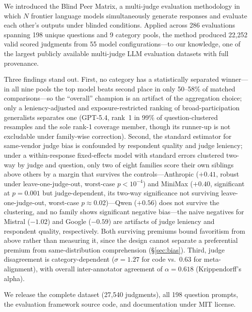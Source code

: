 \documentclass{article}
\begin{document}
We introduced the Blind Peer Matrix, a multi-judge evaluation methodology in which $N$ frontier language models simultaneously generate responses and evaluate each other's outputs under blinded conditions. Applied across 286 evaluations spanning 198 unique questions and 9 category pools, the method produced 22,252 valid scored judgments from 55 model configurations---to our knowledge, one of the largest publicly available multi-judge LLM evaluation datasets with full provenance.

Three findings stand out. First, no category has a statistically separated winner---in all nine pools the top model beats second place in only 50--58\% of matched comparisons---so the ``overall'' champion is an artifact of the aggregation choice; only a leniency-adjusted and exposure-restricted ranking of broad-participation generalists separates one (GPT-5.4, rank~1 in 99\% of question-clustered resamples and the sole rank-1 coverage member, though its runner-up is not excludable under family-wise correction). Second, the standard estimator for same-vendor judge bias is confounded by respondent quality and judge leniency; under a within-response fixed-effects model with standard errors clustered two-way by judge and question, only two of eight families score their own siblings above others by a margin that survives the controls---Anthropic ($+0.41$, robust under leave-one-judge-out, worst-case $p < 10^{-4}$) and MiniMax ($+0.40$, significant at $p = 0.001$ but judge-dependent, its two-way significance not surviving leave-one-judge-out, worst-case $p \approx 0.02$)---Qwen ($+0.56$) does not survive the clustering, and no family shows significant negative bias---the naive negatives for Mistral ($-1.02$) and Google ($-0.59$) are artifacts of judge leniency and respondent quality, respectively. Both surviving premiums bound favoritism from above rather than measuring it, since the design cannot separate a preferential premium from same-distribution comprehension (\S\ref{sec:bias}). Third, judge disagreement is category-dependent ($\sigma = 1.27$ for code vs.\ $0.63$ for meta-alignment), with overall inter-annotator agreement of $\alpha = 0.618$ (Krippendorff's alpha).

We release the complete dataset (27,540 judgments), all 198 question prompts, the evaluation framework source code, and documentation under MIT license.



\end{document}
